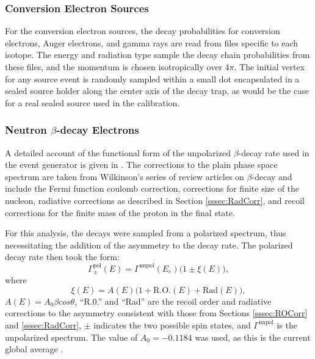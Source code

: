 \subsubsection{Conversion Electron Sources}
For the conversion electron sources, the decay probabilities for conversion electrons,
Auger electrons, and gamma rays are read from files specific to each isotope.
The energy and radiation type sample the decay chain probabilities from these files, and
the momentum is chosen isotropically over 4$\pi$. The initial vertex for any source
event is randomly sampled within a small dot encapsulated in a sealed source holder
along the center axis of the decay trap, as would be the case for a real sealed
source used in the calibration.

\subsubsection{Neutron $\beta$-decay Electrons} \label{sssec:betaSim}

A detailed account of the functional form of the unpolarized $\beta$-decay rate used in the
event generator
is given in \cite{mpmThesis}. The corrections to the plain phase space spectrum are taken from
Wilkinson's series of review articles on $\beta$-decay
\cite{wilkinson1982,wilkinson1989evaluation,wilkinson1990evaluation,wilkinson1993evaluation,
  wilkinson1995evaluation,wilkinson1997evaluation,wilkinson1998evaluation} and include
the Fermi function coulomb correction, corrections for finite size of the nucleon, radiative
corrections as described in Section \ref{sssec:RadCorr}, and recoil corrections for the finite
mass of the proton in the final state.

For this analysis, the decays were sampled from a polarized spectrum, thus necessitating the
addition of the asymmetry to the decay rate. The polarized decay rate then took the form:
\begin{equation}
  \Gamma^{\mathrm{pol}}_\pm(E) = \Gamma^{\mathrm{unpol}}(E_e) \bigg( 1 \pm \xi(E) \bigg),
\end{equation}
where
\begin{equation}
  \xi(E) = A(E)\Big(1+\mathrm{R.O.}(E)+\mathrm{Rad}(E)\Big),
\end{equation}
$A(E)=A_0\beta cos\theta$, ``R.0.'' and ``Rad'' are the recoil order and radiative corrections to the asymmetry
consistent with those from Sections \ref{sssec:ROCorr} and \ref{sssec:RadCorr}, $\pm$ indicates the two possible spin states,
and $\Gamma^{\mathrm{unpol}}$ is the unpolarized
spectrum. The value of $A_0= -0.1184$ was used, as this is the current global average \cite{pdg}.


